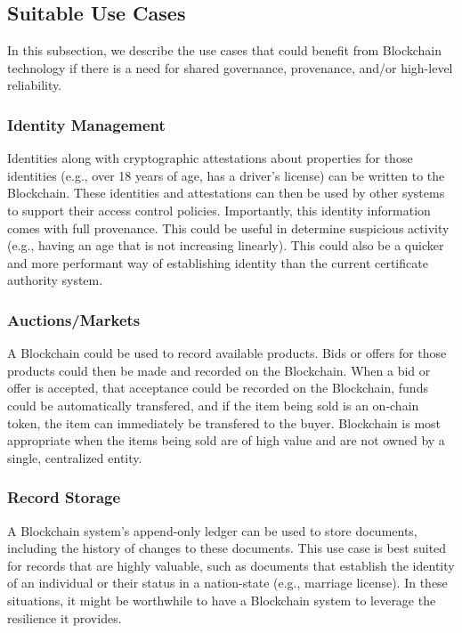\subsection{Suitable Use Cases}
In this subsection, we describe the use cases that could benefit from Blockchain technology if there is a need for shared governance, provenance, and/or high-level reliability.

\subsubsection{Identity Management}
Identities along with cryptographic attestations about properties for those identities (e.g., over 18 years of age, has a driver's license) can be written to the Blockchain.
These identities and attestations can then be used by other systems to support their access control policies.
Importantly, this identity information comes with full provenance. This could be useful in determine suspicious activity (e.g., having an age that is not increasing linearly).
This could also be a quicker and more performant way of establishing identity than the current certificate authority system.

\subsubsection{Auctions/Markets}
A Blockchain could be used to record available products.
Bids or offers for those products could then be made and recorded on the Blockchain.
When a bid or offer is accepted, that acceptance could be recorded on the Blockchain, funds could be automatically transfered, and if the item being sold is an on-chain token, the item can immediately be transfered to the buyer.
Blockchain is most appropriate when the items being sold are of high value and are not owned by a single, centralized entity.

\subsubsection{Record Storage}
A Blockchain system's append-only ledger can be used to store documents, including the history of changes to these documents.
This use case is best suited for records that are highly valuable, such as documents that establish the identity of an individual or their status in a nation-state (e.g., marriage license).
In these situations, it might be worthwhile to have a Blockchain system to leverage the resilience it provides.


